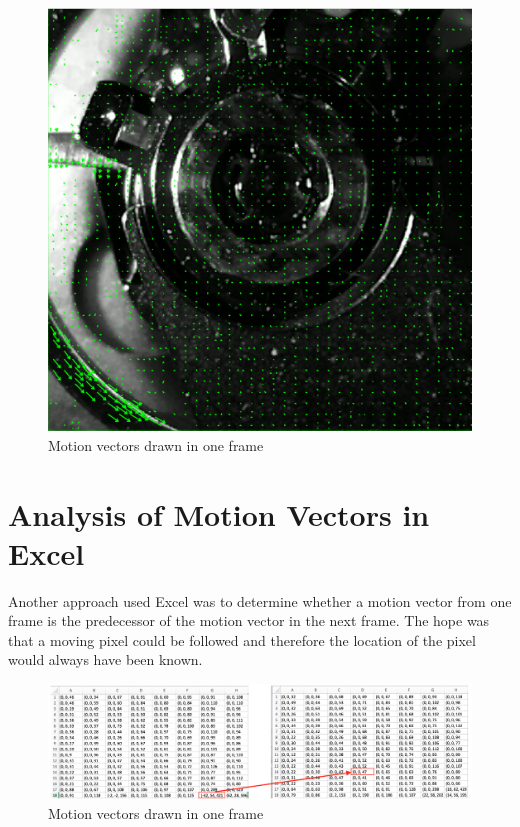 \documentclass[12pt, a4paper]{report}
\begin{document}
    \noindent
    \begin{figure}[H]
    \centering
    \includegraphics[scale=0.5]{Images/motion_vectors.png}
    
    \caption{Motion vectors drawn in one frame}
    \end{figure}
    
    \section{Analysis of Motion Vectors in Excel}
    Another approach used Excel was to determine whether a motion vector from one frame is the predecessor of the motion vector in the next frame.
    The hope was that a moving pixel could be followed and therefore the location of the pixel would always have been known.
    
     \begin{figure}[H]
    \centering
    \includegraphics[scale=0.32]{Images/analysis_mv_excel.png}
    
    \caption{Motion vectors drawn in one frame}
    \end{figure}
    
\end{document}
